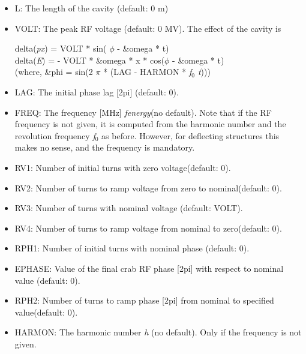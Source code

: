 \begin{itemize}
	\item L: The length of the cavity (default: 0 m) 
	\item VOLT: The peak RF voltage (default: 0 MV). The effect of the cavity is 

 delta(\textit{px})  = VOLT * sin( $\phi$ - \&omega * t) 
\\ delta(\textit{E})  = -  VOLT * \&omega * x * cos($\phi$ - \&omega * t) 
\\ (where, \&phi =  sin(2 $\pi$ * (LAG - HARMON * \textit{f$_0$ t}))) 
\\



	\item LAG: The initial phase lag [2pi] (default: 0). 
	\item FREQ: The frequency [MHz] \textit{fenergy}(no default). Note that if the RF frequency is not given, it is computed from the harmonic number and the revolution frequency \textit{f$_0$} as before. However, for deflecting structures this makes no sense,  and the frequency is mandatory. 
\\
	\item RV1: Number of initial turns with zero voltage(default: 0). 
	\item RV2: Number of turns to ramp voltage from zero to nominal(default: 0). 
	\item RV3: Number of turns with nominal voltage (default: VOLT). 
	\item RV4: Number of turns to ramp voltage from nominal to zero(default: 0).  
\\
	\item RPH1: Number of initial turns with nominal phase (default: 0). 
	\item EPHASE: Value of the final crab RF phase [2pi] with respect to  nominal value (default: 0). 
	\item RPH2: Number of turns to ramp phase [2pi] from nominal to specified value(default: 0). 
\\
	\item HARMON: The harmonic number \textit{h} (no default). Only if the frequency is not given. 


\end{itemize}
